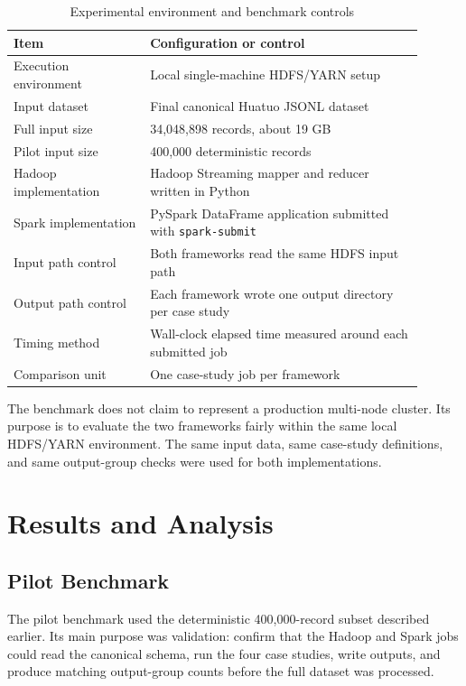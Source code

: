 \documentclass[12pt,a4paper]{article}
\let\oldsection\section
\renewcommand{\section}{\clearpage\oldsection}
\begin{document}
\begin{table}[H]
\centering
\caption{Experimental environment and benchmark controls}
\label{tab:experimental-setup}
\begin{tabular}{p{0.30\linewidth}p{0.60\linewidth}}
\toprule
Item & Configuration or control \\
\midrule
Execution environment & Local single-machine HDFS/YARN setup \\
Input dataset & Final canonical Huatuo JSONL dataset \\
Full input size & 34,048,898 records, about 19 GB \\
Pilot input size & 400,000 deterministic records \\
Hadoop implementation & Hadoop Streaming mapper and reducer written in Python \\
Spark implementation & PySpark DataFrame application submitted with \texttt{spark-submit} \\
Input path control & Both frameworks read the same HDFS input path \\
Output path control & Each framework wrote one output directory per case study \\
Timing method & Wall-clock elapsed time measured around each submitted job \\
Comparison unit & One case-study job per framework \\
\bottomrule
\end{tabular}
\end{table}

The benchmark does not claim to represent a production multi-node cluster. Its purpose is to evaluate the two frameworks fairly within the same local HDFS/YARN environment. The same input data, same case-study definitions, and same output-group checks were used for both implementations.

\section{Results and Analysis}

\subsection{Pilot Benchmark}

The pilot benchmark used the deterministic 400,000-record subset described earlier. Its main purpose was validation: confirm that the Hadoop and Spark jobs could read the canonical schema, run the four case studies, write outputs, and produce matching output-group counts before the full dataset was processed.
\end{document}
